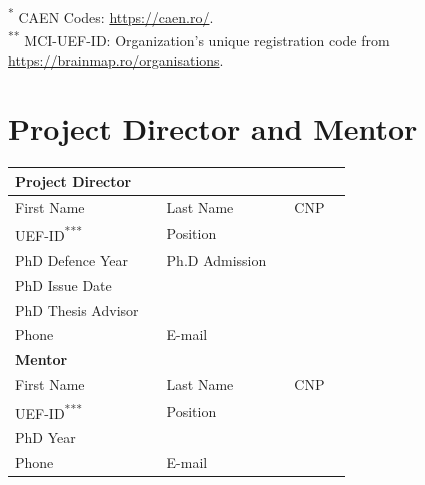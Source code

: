 \documentclass[draftproposal,pncdia]{pncdi-pd}
\begin{document}
{\footnotesize
\noindent \textsuperscript{*} CAEN Codes: \url{https://caen.ro/}. \\
\textsuperscript{**} MCI-UEF-ID: Organization's unique registration code from
\url{https://brainmap.ro/organisations}.
}

\section{Project Director and Mentor}

{
\setlength{\arrayrulewidth}{1pt}

\noindent \begin{tabular}{
    |p{}
    |p{}
    |p{}
    |p{}
    |p{}
    |p{}|} \hline
\multicolumn{6}{|l|}{\textbf{Project Director}}
\\ \hline
First Name &
    \cellcolor{PNCDITableYellow} &
Last Name &
    \cellcolor{PNCDITableYellow} &
CNP &
    \cellcolor{PNCDITableYellow}
\\\hline

UEF-ID\textsuperscript{***}
  & \cellcolor{PNCDITableYellow} &
Position &
    \multicolumn{3}{l|}{\cellcolor{PNCDITableYellow}}
\\\hline

PhD Defence Year &
    \cellcolor{PNCDITableYellow} &
Ph.D Admission &
    \multicolumn{3}{l|}{\cellcolor{PNCDITableYellow}}
\\\hline

PhD Issue Date &
    \multicolumn{5}{l|}{\cellcolor{PNCDITableYellow}}
\\\hline

PhD Thesis Advisor &
    \multicolumn{5}{l|}{\cellcolor{PNCDITableYellow}}
\\\hline

Phone &
    \cellcolor{PNCDITableYellow} &
E-mail &
    \multicolumn{3}{l|}{\cellcolor{PNCDITableYellow}}
\\\hline

\multicolumn{6}{|l|}{\textbf{Mentor}}
\\\hline

First Name &
    \cellcolor{PNCDITableYellow} &
Last Name &
    \cellcolor{PNCDITableYellow} &
CNP &
    \cellcolor{PNCDITableYellow}
\\\hline

UEF-ID\textsuperscript{***} &
    \cellcolor{PNCDITableYellow} &
Position &
    \multicolumn{3}{l|}{\cellcolor{PNCDITableYellow}}
\\\hline

PhD Year &
    \multicolumn{5}{l|}{\cellcolor{PNCDITableYellow}}
\\\hline

Phone &
    \cellcolor{PNCDITableYellow} &
E-mail &
    \multicolumn{3}{l|}{\cellcolor{PNCDITableYellow}}
\\\hline
\end{tabular}
}
\end{document}
